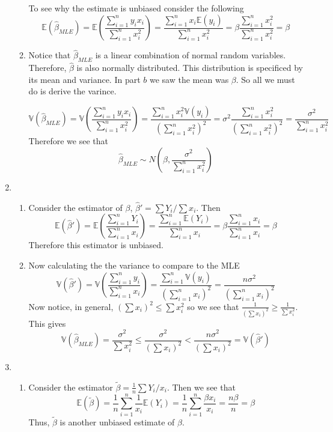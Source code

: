 \documentclass[12pt]{article}  %
\newcommand{\E}{{\mathbb{E}}}
\begin{document}
\begin{enumerate}
\begin{enumerate}
To see why the estimate is unbiased consider the following $$\E(\hat{\beta}_{MLE}) = \E\left( \frac{\sum_{i=1}^ny_ix_i}{\sum_{i=1}^nx_i^2}\right) =  \frac{\sum_{i=1}^nx_i\E(y_i)}{\sum_{i=1}^nx_i^2} = \beta\frac{\sum_{i=1}^nx_i^2}{\sum_{i=1}^nx_i^2} = \beta$$

\item Notice that $\hat{\beta}_{MLE}$ is a linear combination of normal random variables. Therefore, $\hat{\beta}$ is also normally distributed. This distribution is specificed by its mean and variance. In part $b$ we saw the mean was $\beta$. So all we must do is derive the varince. 

$$\mathbb{V}(\hat{\beta}_{MLE}) = \mathbb{V}\left(\frac{\sum_{i=1}^ny_ix_i}{\sum_{i=1}^nx_i^2}\right) = \frac{\sum_{i=1}^nx_i^2\mathbb{V}(y_i)}{\left(\sum_{i=1}^nx_i^2\right)^2} = \sigma^2\frac{\sum_{i=1}^nx_i^2}{\left(\sum_{i=1}^nx_i^2\right)^2} = \frac{\sigma^2}{\sum_{i=1}^nx_i^2}$$ Therefore we see that $$\hat{\beta}_{MLE}\sim N\left(\beta, \frac{\sigma^2}{\sum_{i=1}^n x_i^2}\right)$$
\end{enumerate}

\item 
\begin{enumerate}
\item Consider the estimator of $\beta$, $\hat{\beta}' = \sum Y_i/\sum x_i$. Then $$\E(\hat{\beta}') = \E\left(\frac{\sum_{i=1}^n Y_i}{\sum_{i=1}^n x_i}\right) = \frac{\sum_{i=1}^n \E(Y_i)}{\sum_{i=1}^n x_i} = \beta \frac{\sum_{i=1}^n x_i}{\sum_{i=1}^n x_i} = \beta$$
Therefore this estimator is unbiased. 
\item Now calculating the the variance to compare to the MLE 
$$\mathbb{V}(\hat{\beta}') = \mathbb{V}\left(\frac{\sum_{i=1}^ny_i}{\sum_{i=1}^nx_i}\right) = \frac{\sum_{i=1}^n\mathbb{V}(y_i)}{\left(\sum_{i=1}^nx_i\right)^2} = \frac{n\sigma^2}{(\sum_{i=1}^n x_i)^2}$$ 
Now notice, in general, $(\sum x_i)^2\leq \sum x_i^2$ so we see that $\frac{1}{(\sum x_i)^2}\geq \frac{1}{\sum x_i^2}$. This gives $$\mathbb{V}(\hat{\beta}_{MLE}) = \frac{\sigma^2}{\sum x_i^2}\leq \frac{\sigma^2}{(\sum x_i)^2}<\frac{n\sigma^2}{(\sum x_i)^2} = \mathbb{V}(\hat{\beta}')$$
\end{enumerate}

\item \begin{enumerate}
\item Consider the estimator $\tilde{\beta} = \frac{1}{n}\sum Y_i/x_i$. Then we see that $$\E(\tilde{\beta}) = \frac{1}{n}\sum_{i=1}^n \frac{1}{x_i}\E(Y_i) = \frac{1}{n}\sum_{i=1}^n \frac{\beta x_i}{x_i} = \frac{n\beta}{n} = \beta$$
Thus, $\tilde{\beta}$ is another unbiased estimate of $\beta$. 


\end{enumerate}
\end{enumerate}
\end{document}
